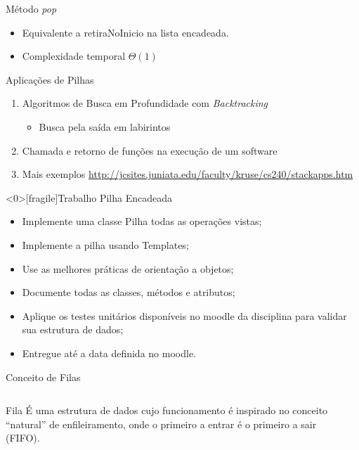 \documentclass[12pt,table,xcolor={dvipsnames}]{beamer}
\begin{document}
\begin{frame}[fragile]{Método \textit{pop}}
	\begin{itemize}
		\item Equivalente a retiraNoInicio na lista encadeada.
		\item Complexidade temporal $\Theta(1)$
	\end{itemize}	
\end{frame}	

\begin{frame}[fragile]{Aplicações de Pilhas}
\begin{enumerate}
	\item Algoritmos de Busca em Profundidade com \textit{Backtracking} 
	\begin{itemize}
		\item Busca pela saída em labirintos
	\end{itemize}
	\item Chamada e retorno de funções na execução de um software
	\item Mais exemplos \tiny\url{http://jcsites.juniata.edu/faculty/kruse/cs240/stackapps.htm}
\end{enumerate}
\end{frame}

\begin{frame}<0>[fragile]{Trabalho Pilha Encadeada}
\begin{itemize}
\item Implemente uma classe Pilha todas as operações vistas;
\item Implemente a pilha usando Templates;
\item Use as melhores práticas de orientação a objetos;
\item Documente todas as classes, métodos e atributos;
\item Aplique os testes unitários disponíveis no moodle da disciplina para validar sua estrutura de dados;
\item Entregue até a data definida no moodle.
\end{itemize}
\end{frame}

\begin{frame}{Conceito de Filas}
\begin{columns}
\begin{block}{Fila}
É uma estrutura de dados cujo funcionamento é inspirado no conceito “natural” de enfileiramento, onde o primeiro a entrar é o primeiro a sair (FIFO).
\end{block}
\begin{center}
\end{center}
\end{columns}
\end{frame}
\end{document}
